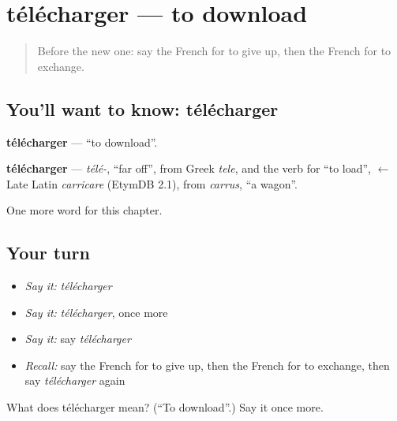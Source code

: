 \section[télécharger]{télécharger — to download}

\label{lesson:FR-C183-telecharger}



\begin{quote}
Before the new one: say the French for to give up, then the French for to exchange.
\end{quote}

\subsection*{You'll want to know: télécharger}
\textbf{télécharger} — \textquotedblleft{}to download\textquotedblright{}.

\begin{cousinweb}
\textbf{télécharger} — \emph{télé-}, \textquotedblleft{}far off\textquotedblright{}, from Greek \emph{tele}, and the verb for \textquotedblleft{}to load\textquotedblright{}, $\leftarrow$ Late Latin \emph{carricare} (EtymDB 2.1), from \emph{carrus}, \textquotedblleft{}a wagon\textquotedblright{}.
\end{cousinweb}

\begin{grammarlens}[title={What you've built}]
One more word for this chapter.
\end{grammarlens}

\subsection*{Your turn}
\begin{itemize}
\raggedright
  \item \emph{Say it:} \emph{télécharger}
  \item \emph{Say it:} \emph{télécharger}, once more
  \item \emph{Say it:} say \emph{télécharger}
  \item \emph{Recall:} say the French for to give up, then the French for to exchange, then say \emph{télécharger} again
\end{itemize}

\begin{tcolorbox}[breakable,colback=teal!4,colframe=teal!35!black,title={Before you move on}]
What does télécharger mean? (\textquotedblleft{}To download\textquotedblright{}.) Say it once more.
\end{tcolorbox}
